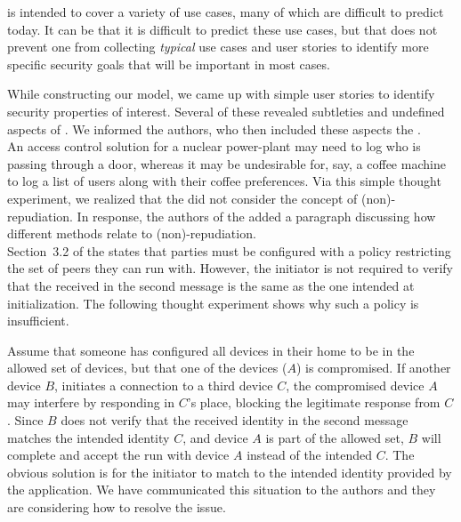 \documentclass[runningheads, envcountsame, hidelinks, a4paper, draft, x11names]{llncs}
\begin{document}
\mEdhoc{} is intended to cover a variety of use cases, many of which are
difficult to predict today.
%
It can be that it is difficult to predict these use cases, but that does not
prevent one from collecting \emph{typical} use cases and user stories
to identify more specific security goals that will be important in most cases.
%

While constructing our model, we came up with simple user stories to identify
security properties of interest.
%
Several of these revealed subtleties and undefined aspects of \mEdhoc{}.
%
We informed the \mEdhoc{} authors, who then included these aspects the
\mSpec{}.\\
%

An access control solution for a nuclear power-plant may need to log who is
passing through a door, whereas it may be undesirable for, say, a coffee
machine to log a list of users along with their coffee preferences.
%
Via this simple thought experiment, we realized that the \mSpec{} did not
consider the concept of (non)-repudiation.
%
In response, the authors of the \mSpec{} added a paragraph discussing how
different methods relate to (non)-repudiation.\\

Section~3.2 of the \mSpec{} states that parties must be configured
with a policy restricting the set of peers they can run \mEdhoc{} with.
%
However, the initiator is not required to verify that the \mIdcredr{} received
in the second message is the same as the one intended at initialization.
%
The following thought experiment shows why such a policy is insufficient.
%

Assume that someone has configured all devices in their home to be in the
allowed set of devices, but that one of the devices ($A$) is compromised.
%
If another device $B$, initiates a connection to a third device $C$, the
compromised device $A$ may interfere by responding in $C$'s place, blocking
the legitimate response from $C$.
%
Since $B$ does not verify that the received identity in the second message
matches the intended identity $C$, and device $A$ is part of the allowed set,
$B$ will complete and accept the \mEdhoc{} run with device $A$ instead of the
intended $C$.
%
The obvious solution is for the initiator to match \mIdcredr{} to the intended
identity provided by the application.
%
We have communicated this situation to the \mEdhoc{} authors and they are considering
how to resolve the issue.
%
\end{document}
